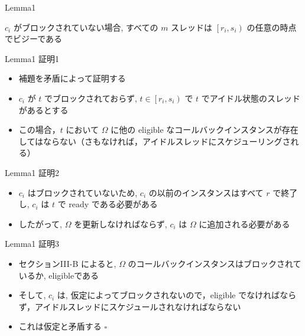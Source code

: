 \begin{frame}{Lemma1}
    \begin{lemma}[]
        $c_{i}$ がブロックされていない場合, すべての $m$ スレッドは $\left[r_{i}, s_{i}\right)$ の任意の時点でビジーである
    \end{lemma}
\end{frame}





\begin{frame}{Lemma1 証明1}
    \begin{itemize}
        \item 補題を矛盾によって証明する
        \item $c_{i}$ が $t$ でブロックされておらず, $t \in\left[r_{i}, s_{i}\right)$ で $t$ でアイドル状態のスレッドがあるとする
        \item この場合，$t$ において $\Omega$ に他の eligible なコールバックインスタンスが存在してはならない（さもなければ，アイドルスレッドにスケジューリングされる）
    \end{itemize}

\end{frame}

\begin{frame}{Lemma1 証明2}
    \begin{itemize}
        \item $c_{i}$ はブロックされていないため, $c_{i}$ の以前のインスタンスはすべて $r$ で終了し, $c_{i}$ は $t$ で ready である必要がある
        \item したがって, $\Omega$ を更新しなければならず, $c_{i}$ は $\Omega$ に追加される必要がある

    \end{itemize}
\end{frame}

\begin{frame}{Lemma1 証明3}
    \begin{itemize}
        \item セクションIII-B によると, $\Omega$ のコールバックインスタンスはブロックされているか, eligibleである
        \item そして, $c_{i}$ は, 仮定によってブロックされないので，eligible でなければならず，アイドルスレッドにスケジュールされなければならない
        \item これは仮定と矛盾する $\square$
    \end{itemize}
\end{frame}

